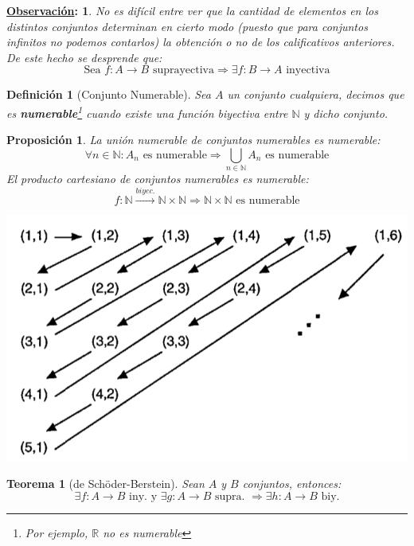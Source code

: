 \documentclass[10pt,a4paper,openright]{book}
\theoremstyle{break}
\newtheorem*{defi}{Definición}
\newtheorem*{theo}{Teorema}
\newtheorem*{prop}{Proposición}
\newtheorem*{obs}{\underline{Observación}:}
\begin{document}
\begin{obs}
No es difícil entre ver que la cantidad de elementos en los distintos conjuntos determinan en cierto modo (puesto que  para conjuntos infinitos no podemos contarlos) la obtención o no de los calificativos anteriores. De este hecho se desprende que:
$$\mbox{Sea }f: A\rightarrow B\mbox{ suprayectiva}\Rightarrow \exists f: B\rightarrow A \mbox{ inyectiva} $$
\end{obs}

\begin{defi}[Conjunto Numerable]
Sea $A$ un conjunto cualquiera, decimos que es \textbf{numerable}\footnote{Por ejemplo, $\mathbb R$ no es numerable} cuando existe una función biyectiva entre $\mathbb N$ y dicho conjunto.
\end{defi}


\begin{prop}
La unión numerable de conjuntos numerables es numerable:
$$\forall n\in \mathbb N : A_n\mbox{ es numerable}\Rightarrow \bigcup_{n\in \mathbb N} A_n\mbox{ es numerable}$$
El producto cartesiano de conjuntos numerables es numerable:
$$f:\mathbb N\stackrel{biyec.}{\rightarrow} \mathbb N \times \mathbb N \Rightarrow \mathbb N \times \mathbb N\mbox{ es numerable}$$
\begin{center}
\includegraphics[scale=0.25]{nxn numerable}
\end{center}
\end{prop}

\begin{theo}[de Schöder-Berstein]
Sean $A$ y $B$ conjuntos, entonces:
$$\exists f: A\rightarrow B \mbox{ iny.}\mbox{ y } \exists g: A\rightarrow B \mbox{ supra. }\Rightarrow \exists h: A\rightarrow B \mbox{ biy.}$$
\end{theo}
\end{document}
